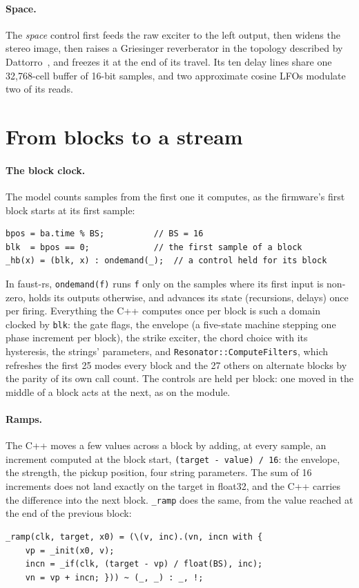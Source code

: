 \documentclass[10pt,a4paper,twocolumn]{article}
\newcommand{\faustrs}{faust-rs}
\newcommand{\code}[1]{\texttt{#1}}
\begin{document}
\paragraph{Space.} The \emph{space} control first feeds the raw exciter to the left output, then widens the stereo image, then raises a Griesinger reverberator in the topology described by Dattorro~\cite{dattorro1997}, and freezes it at the end of its travel. Its ten delay lines share one 32,768-cell buffer of 16-bit samples, and two approximate cosine LFOs modulate two of its reads.

\section{From blocks to a stream}
\label{sec:blocks}

\paragraph{The block clock.} The model counts samples from the first one it computes, as the firmware's first block starts at its first sample:
\begin{lstlisting}
bpos = ba.time % BS;          // BS = 16
blk  = bpos == 0;             // the first sample of a block
_hb(x) = (blk, x) : ondemand(_);  // a control held for its block
\end{lstlisting}
In \faustrs{}, \code{ondemand(f)} runs \code{f} only on the samples where its first input is non-zero, holds its outputs otherwise, and advances its state (recursions, delays) once per firing. Everything the C++ computes once per block is such a domain clocked by \code{blk}: the gate flags, the envelope (a five-state machine stepping one phase increment per block), the strike exciter, the chord choice with its hysteresis, the strings' parameters, and \code{Resonator::ComputeFilters}, which refreshes the first 25 modes every block and the 27 others on alternate blocks by the parity of its own call count. The controls are held per block: one moved in the middle of a block acts at the next, as on the module.

\paragraph{Ramps.} The C++ moves a few values across a block by adding, at every sample, an increment computed at the block start, \code{(target - value) / 16}: the envelope, the strength, the pickup position, four string parameters. The sum of 16 increments does not land exactly on the target in float32, and the C++ carries the difference into the next block. \code{\_ramp} does the same, from the value reached at the end of the previous block:
\begin{lstlisting}
_ramp(clk, target, x0) = (\(v, inc).(vn, incn with {
    vp = _init(x0, v);
    incn = _if(clk, (target - vp) / float(BS), inc);
    vn = vp + incn; })) ~ (_, _) : _, !;
\end{lstlisting}
\end{document}

